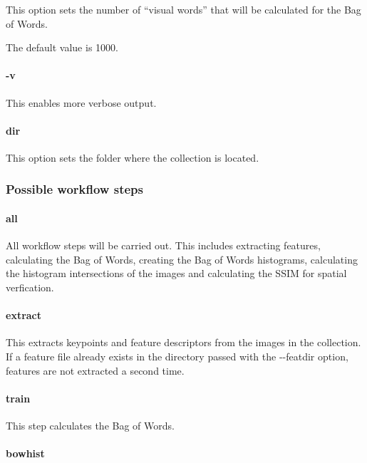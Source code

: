 \documentclass{hitec}
\begin{document}
This option sets the number of ``visual words'' that will be
calculated for the Bag of Words.

The default value is 1000.

\paragraph{\ttfamily-v}

This enables more verbose output.

\paragraph{\ttfamily dir}

This option sets the folder where the collection is located.

\subsubsection*{Possible workflow steps}

\paragraph{\ttfamily all}

All workflow steps will be carried out. This includes extracting features,
calculating the Bag of Words, creating the Bag of Words histograms, calculating 
the histogram intersections of the images and calculating the SSIM for spatial verfication.

\paragraph{\ttfamily extract}

This extracts keypoints and feature descriptors from the images in the collection.
If a feature file already exists in the directory passed with the {\ttfamily -{}-featdir} option,
features are not extracted a second time.

\paragraph{\ttfamily train}

This step calculates the Bag of Words.

\paragraph{\ttfamily bowhist}
\end{document}
